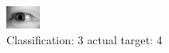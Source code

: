 \begin{figure}[h!]
\begin{center}
\includegraphics[width=0.60\columnwidth]{figures/ID3171_class_3_target_4.png}
\end{center}
\caption{ Classification: 3 actual target: 4}
\label{fig:ID3171_class_3_target_4}
\end{figure}

